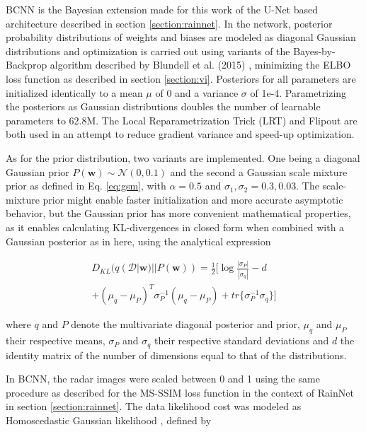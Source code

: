 BCNN is the Bayesian extension made for this work of the U-Net based architecture described in section \ref{section:rainnet}. In the network, posterior probability distributions of weights and biases are modeled as diagonal Gaussian distributions and optimization is carried out using variants of the Bayes-by-Backprop algorithm described by Blundell et al. (2015) \cite{blundell_weight_2015}, minimizing the ELBO loss function as described in section \ref{section:vi}. Posteriors for all parameters are initialized identically to a mean $\mu$ of 0 and a variance $\sigma$ of 1e-4. Parametrizing the posteriors as Gaussian distributions doubles the number of learnable parameters to 62.8M. The Local Reparametrization Trick (LRT) \cite{kingma_variational_2015} and Flipout \cite{wen_flipout_2018} are both used in an attempt to reduce gradient variance and speed-up optimization. 

As for the prior distribution, two variants are implemented. One being a diagonal Gaussian prior $P(\pmb{w}) \sim \mathcal{N}(0,0.1)$ and the second a Gaussian scale mixture prior as defined in Eq. \ref{eq:gsm}, with $\alpha = 0.5$ and $\sigma_1, \sigma_2 = 0.3, 0.03$. The scale-mixture prior might enable faster initialization and more accurate asymptotic behavior, but the Gaussian prior has more convenient mathematical properties, as it enables calculating KL-divergences in closed form when combined with a Gaussian posterior as in here, using the analytical expression

\begin{equation}
\begin{split}
D_{KL}(q(\mathcal{D}|\pmb{w}) || P(\pmb{w})) =
\frac{1}{2}[\log \frac{|\sigma_P|}{|\sigma_q|}
- d \\
+ (\mu_q - \mu_P)^T \sigma_P^{-1}(\mu_q - \mu_P)
+ tr\{\sigma_P^{-1}\sigma_q\}
]
\end{split}
\end{equation}

where $q$ and $P$ denote the multivariate diagonal posterior and prior, $\mu_q$ and $\mu_P$ their respective means, $\sigma_P$ and $\sigma_q$ their respective standard deviations and  $d$ the identity matrix of the number of dimensions equal to that of the distributions. 

In BCNN, the radar images were scaled between 0 and 1 using the same procedure as described for the MS-SSIM loss function in the context of RainNet in section \ref{section:rainnet}. The data likelihood cost was modeled as Homoscedastic Gaussian likelihood \cite{kendall_what_2017}, defined by 

